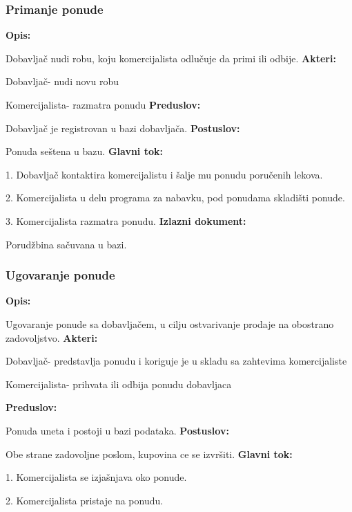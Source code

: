\subsubsection{Primanje ponude}

\textbf{Opis:}

Dobavljač nudi robu, koju komercijalista odlučuje da primi ili odbije.
\newline
\textbf{Akteri:}

Dobavljač- nudi novu robu

Komercijalista- razmatra ponudu
\newline
\textbf{Preduslov:}

Dobavljač je registrovan u bazi dobavljača.
\newline
\textbf{Postuslov:}

Ponuda seštena u bazu.
\newline
\textbf{Glavni tok:}

1. Dobavljač kontaktira komercijalistu i šalje mu ponudu poručenih lekova.

2. Komercijalista u delu programa za nabavku, pod ponudama skladišti ponude.

3. Komercijalista razmatra ponudu.
\newline
\textbf{Izlazni dokument:}

Porudžbina sačuvana u bazi.


\subsubsection{Ugovaranje ponude}

\textbf{Opis:}

Ugovaranje ponude sa dobavljačem, u cilju ostvarivanje prodaje na obostrano zadovoljstvo.
\newline
\textbf{Akteri:}

Dobavljač- predstavlja ponudu i koriguje je u skladu sa zahtevima komercijaliste

Komercijalista- prihvata ili odbija ponudu dobavljaca

\textbf{Preduslov:}

Ponuda uneta i postoji u bazi podataka.
\newline
\textbf{Postuslov:}

Obe strane zadovoljne poslom, kupovina ce se izvršiti.
\newline
\textbf{Glavni tok:}

1. Komercijalista se izjašnjava oko ponude.

2. Komercijalista pristaje na ponudu.

